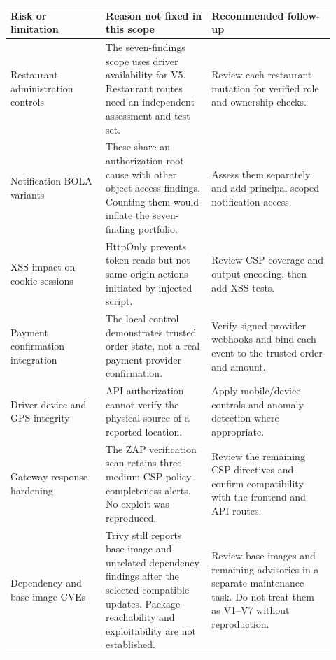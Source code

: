 \documentclass[11pt]{article}
\begin{document}
\begin{longtable}{P{0.27\linewidth}P{0.30\linewidth}P{0.35\linewidth}}
\toprule
{}\textbf{Risk or limitation} & \textbf{Reason not fixed in this scope} & \textbf{Recommended follow-up} \\
\midrule
\endhead
Restaurant administration controls & The seven-findings scope uses driver availability for V5. Restaurant routes need an independent assessment and test set. & Review each restaurant mutation for verified role and ownership checks. \\
Notification BOLA variants & These share an authorization root cause with other object-access findings. Counting them would inflate the seven-finding portfolio. & Assess them separately and add principal-scoped notification access. \\
XSS impact on cookie sessions & HttpOnly prevents token reads but not same-origin actions initiated by injected script. & Review CSP coverage and output encoding, then add XSS tests. \\
Payment confirmation integration & The local control demonstrates trusted order state, not a real payment-provider confirmation. & Verify signed provider webhooks and bind each event to the trusted order and amount. \\
Driver device and GPS integrity & API authorization cannot verify the physical source of a reported location. & Apply mobile/device controls and anomaly detection where appropriate. \\
Gateway response hardening & The ZAP verification scan retains three medium CSP policy-completeness alerts. No exploit was reproduced. & Review the remaining CSP directives and confirm compatibility with the frontend and API routes. \\
Dependency and base-image CVEs & Trivy still reports base-image and unrelated dependency findings after the selected compatible updates. Package reachability and exploitability are not established. & Review base images and remaining advisories in a separate maintenance task. Do not treat them as V1--V7 without reproduction. \\
\bottomrule
\end{longtable}
\end{document}
